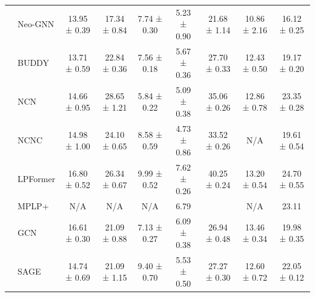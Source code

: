 \documentclass{article}
\newcommand{\catdot}[1]{%
  \tikz[baseline={(mark.base)}]{\node[circle, draw=black, line width=0.25pt, fill=#1, inner sep=2pt] (mark) {};}%
}
\theoremstyle{plain}
\theoremstyle{definition}
\theoremstyle{remark}
\begin{document}
\begin{table}[t]
{\begin{tabular}{@{}clccccccc@{}}
             & Neo-GNN             & 13.95 ± 0.39                        & 17.34 ± 0.84                        & 7.74 ± 0.30                        & 5.23 ± 0.90                        & 21.68 ± 1.14                        & 10.86 ± 2.16                        & 16.12 ± 0.25                        \\
             & BUDDY               & 13.71 ± 0.59                        & 22.84 ± 0.36                        & 7.56 ± 0.18                        & 5.67 ± 0.36                        & 27.70 ± 0.33                        & 12.43 ± 0.50                        & 19.17 ± 0.20                        \\
             & NCN                 & 14.66 ± 0.95                        & {\color[HTML]{EA4335} 28.65 ± 1.21} & 5.84 ± 0.22                        & 5.09 ± 0.38                        & 35.06 ± 0.26                        & 12.86 ± 0.78                        & 23.35 ± 0.28                        \\
             & NCNC                & {\color[HTML]{4285F4} 14.98 ± 1.00} & {\color[HTML]{4285F4} 24.10 ± 0.65} & {8.58 ± 0.59} & 4.73 ± 0.86                        & 33.52 ± 0.26                        & N/A                                 & 19.61 ± 0.54                        \\
             & LPFormer            & {\color[HTML]{EA4335} 16.80 ± 0.52} & {\color[HTML]{34A853} 26.34 ± 0.67} & {\color[HTML]{EA4335} 9.99 ± 0.52} & {\color[HTML]{EA4335} 7.62 ± 0.26} & 40.25 ± 0.24 & {\color[HTML]{4285F4} 13.20 ± 0.54} & {\color[HTML]{EA4335} 24.70 ± 0.55} \\ \midrule
    \multirow{1}{*}{\raisebox{0.75ex}{\catdot{catorange}}} 
             & MPLP+               & N/A                                 & N/A                                 & N/A                                & {\color{secondbest} 6.79}                               & \color{thirdbest}{41.40}                               & N/A                                 & 23.11                               \\ \midrule
    \multirow{5}{*}{\raisebox{0.75ex}{\catdot{catred}}} 
             & GCN                 & {\color[HTML]{34A853} 16.61 ± 0.30} & 21.09 ± 0.88                        & 7.13 ± 0.27                        & 6.09 ± 0.38                        & 26.94 ± 0.48                        & {\color[HTML]{34A853} 13.46 ± 0.34} & 19.98 ± 0.35                        \\
             & SAGE                & 14.74 ± 0.69                        & 21.09 ± 1.15                        & {\color[HTML]{34A853} 9.40 ± 0.70} & 5.53 ± 0.50                        & 27.27 ± 0.30                        & 12.60 ± 0.72                        & 22.05 ± 0.12                        \\

\end{tabular}}
\end{table}
\end{document}
